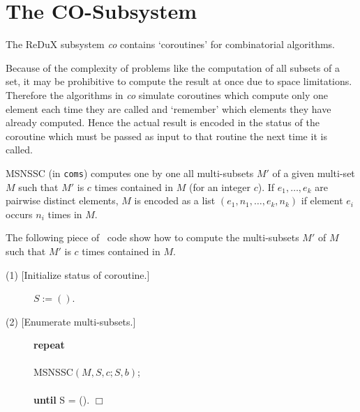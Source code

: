 \section{The CO-Subsystem}

The ReDuX subsystem {\em co} contains `coroutines' for combinatorial
algorithms.

Because of the complexity of problems like the computation of all subsets of
a set, it may be prohibitive to compute the result at once due to
space limitations.
Therefore the algorithms in {\em co} simulate coroutines which compute 
only one element each time they are called and
`remember' which elements they have already computed.
Hence the actual result is encoded in the status of the coroutine which 
must be passed as input to that routine the next time it is called.

MSNSSC (in {\tt coms}) computes one by one all multi-subsets $M'$ of a
given multi-set $M$ such that $M'$ is $c$ times contained in $M$
(for an integer $c$).
If $e_1,\ldots,e_k$ are pairwise distinct elements, $M$ is encoded as a list
$(e_1, n_1, \ldots, e_k, n_k)$ if element $e_i$ occurs $n_i$ times in $M$.
\begin{example}
 The following piece of \ALDES\ code show how to compute the
 multi-subsets $M'$ of $M$ such that $M'$ is $c$ times contained in $M$.
 \begin{description}
      \item[{(1) [Initialize status of coroutine.]}] \( S:=() \). 
      \item[{(2) [Enumerate multi-subsets.]}] {\bf repeat} \\
        \null [ \( S^* = \{ s_1,s_3, \ldots, s_{|S|-1} \} \) is
         a multi-subset of $M$ which fits $c$ times in $M$
            where \( s_i = \mbox{FIRST}(S_i)  \)
          and \( S = (S_1, \ldots, S_{|S|}) \). ] \\
        MSNSSC$(M,S,c; S,b)$; \\
        \null [ \( b = 1 \) if the length of $S$ has changed. ] \\
       {\bf until} S = (). \hfill $\Box$
 \end{description}
\end{example}

